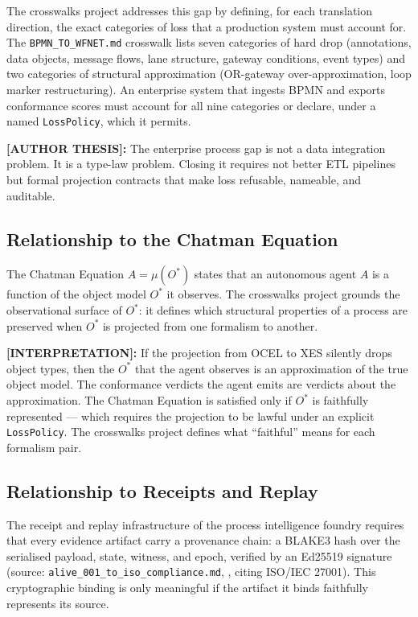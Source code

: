 The crosswalks project addresses this gap by defining, for each translation direction, the exact
categories of loss that a production system must account for. The \texttt{BPMN\_TO\_WFNET.md}
crosswalk lists seven categories of hard drop (annotations, data objects, message flows, lane
structure, gateway conditions, event types) and two categories of structural approximation
(\textsc{OR}-gateway over-approximation, loop marker restructuring). An enterprise system that
ingests \textsc{BPMN} and exports conformance scores must account for all nine categories or
declare, under a named \texttt{LossPolicy}, which it permits.

\textbf{[AUTHOR THESIS]:} The enterprise process gap is not a data integration problem. It is
a type-law problem. Closing it requires not better ETL pipelines but formal projection contracts
that make loss refusable, nameable, and auditable.

\subsection{Relationship to the Chatman Equation}
\label{sec:crosswalks-lineage-chatman}

The Chatman Equation $A = \mu(O^*)$ states that an autonomous agent $A$ is a function of the
object model $O^*$ it observes. The crosswalks project grounds the observational surface of
$O^*$: it defines which structural properties of a process are preserved when $O^*$ is projected
from one formalism to another.

\textbf{[INTERPRETATION]:} If the projection from \textsc{OCEL} to \textsc{XES} silently drops
object types, then the $O^*$ that the agent observes is an approximation of the true object
model. The conformance verdicts the agent emits are verdicts about the approximation. The
Chatman Equation is satisfied only if $O^*$ is faithfully represented --- which requires the
projection to be lawful under an explicit \texttt{LossPolicy}. The crosswalks project defines
what ``faithful'' means for each formalism pair.

\subsection{Relationship to Receipts and Replay}
\label{sec:crosswalks-lineage-receipts}

The receipt and replay infrastructure of the process intelligence foundry requires that every
evidence artifact carry a provenance chain: a \textsc{BLAKE3} hash over the serialised payload,
state, witness, and epoch, verified by an Ed25519 signature (source: \texttt{alive\_001\_to\_iso\_compliance.md},
, citing \textsc{ISO/IEC} 27001). This cryptographic binding is only meaningful
if the artifact it binds faithfully represents its source.

